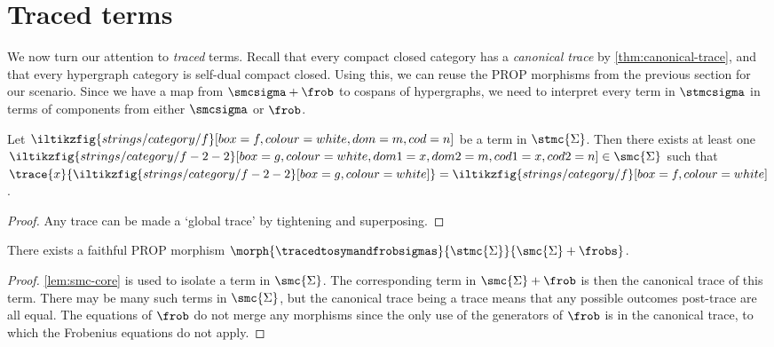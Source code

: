 
\section{Traced terms}

We now turn our attention to \emph{traced} terms.
Recall that every compact closed category has a \emph{canonical trace} by
\cref{thm:canonical-trace}, and that every hypergraph category is self-dual
compact closed.
Using this, we can reuse the PROP morphisms from the previous section for our
scenario.
Since we have a map from \(\smcsigma + \frob\) to cospans of hypergraphs, we
need to interpret every term in \(\stmcsigma\) in terms of components from
either \(\smcsigma\) or \(\frob\).

\begin{lemma}\label{lem:smc-core}
    Let \(\iltikzfig{strings/category/f}[box=f,colour=white,dom=m,cod=n]\) be a
    term in \(\stmc{\Sigma}\).
    Then there exists at least one \(
        \iltikzfig{strings/category/f-2-2}[box=g,colour=white,dom1=x,dom2=m,cod1=x,cod2=n]
        \in \smc{\Sigma}
    \) such that \(
        \trace{x}{\iltikzfig{strings/category/f-2-2}[box=g, colour=white]}
        =
        \iltikzfig{strings/category/f}[box=f,colour=white]
    \).
\end{lemma}
\begin{proof}
    Any trace can be made a `global trace' by tightening and superposing.
\end{proof}

\begin{proposition}
    There exists a faithful PROP morphism \(
        \morph{\tracedtosymandfrobsigmas}{\stmc{\Sigma}}{\smc{\Sigma} + \frobs}
    \).
\end{proposition}
\begin{proof}
    \cref{lem:smc-core} is used to isolate a term in \(\smc{\Sigma}\).
    The corresponding term in \(\smc{\Sigma} + \frob\) is then the canonical
    trace of this term.
    There may be many such terms in \(\smc{\Sigma}\), but the canonical trace
    being a trace means that any possible outcomes post-trace are all equal.
    The equations of \(\frob\) do not merge any morphisms
    since the only use of the generators of \(\frob\) is in the canonical trace,
    to which the Frobenius equations do not apply.
\end{proof}

